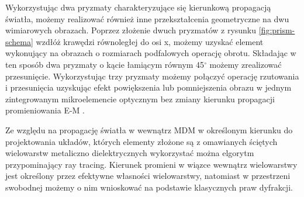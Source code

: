 Wykorzystując dwa pryzmaty charakteryzujące się kierunkową propagacją światła, możemy realizować również inne przekształcenia geometryczne na dwu wimiarowych obrazach. Poprzez złożenie dwuch pryzmatów z rysunku \ref{fig:prism-schema} wzdłóż krawędzi równoległej do osi x, możemy uzyskać element wykonujący na obrazach o rozmiarach podfalowych operację obrotu. Składając w ten sposób dwa pryzmaty o kącie łamiącym równym 45$^\circ$ możemy zrealizować przesunięcie. Wykorzystując trzy pryzmaty możemy połączyć operację rzutowania i przesunięcia uzyskując efekt powiększenia lub pomniejszenia obrazu w jednym zintegrowanym mikroelemencie optycznym bez zmiany kierunku propagacji promieniowania E-M \cite{Zhao:08}.

Ze względu na propagację światła w wewnątrz MDM w określonym kierunku do projektowania układów, których elementy złożone są z omawianych ściętych wielowarstw metaliczno dielektrycznych wykorzystać można elgorytm przypominający ray tracing. Kierunek promieni w wiązce wewnątrz wielowarstwy jest określony przez efektywne własności wielowarstwy, natomiast w przestrzeni swobodnej możemy o nim wnioskować na podstawie klasycznych praw dyfrakcji\cite{pastuszczak2011slanted}.

